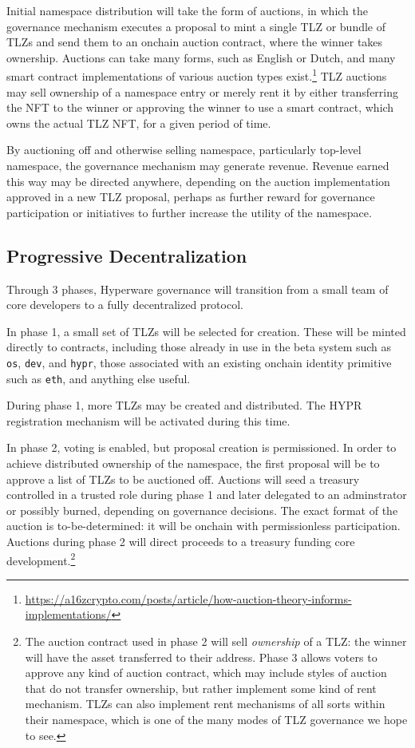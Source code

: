 \documentclass[runningheads]{llncs}
\begin{document}
Initial namespace distribution will take the form of auctions, in which the governance mechanism executes a proposal to mint a single TLZ or bundle of TLZs and send them to an onchain auction contract, where the winner takes ownership.
Auctions can take many forms, such as English or Dutch, and many smart contract implementations of various auction types exist.\footnote{\url{https://a16zcrypto.com/posts/article/how-auction-theory-informs-implementations/}}
TLZ auctions may sell ownership of a namespace entry or merely rent it by either transferring the NFT to the winner or approving the winner to use a smart contract, which owns the actual TLZ NFT, for a given period of time.

By auctioning off and otherwise selling namespace, particularly top-level namespace, the governance mechanism may generate revenue.
Revenue earned this way may be directed anywhere, depending on the auction implementation approved in a new TLZ proposal, perhaps as further reward for governance participation or initiatives to further increase the utility of the namespace.

\subsection{Progressive Decentralization}
\label{sec:decentralization}

Through 3 phases, Hyperware governance will transition from a small team of core developers to a fully decentralized protocol.

In phase 1, a small set of TLZs will be selected for creation.
These will be minted directly to contracts, including those already in use in the beta system such as \verb|os|, \verb|dev|, and \verb|hypr|, those associated with an existing onchain identity primitive such as \verb|eth|, and anything else useful.

During phase 1, more TLZs may be created and distributed.
The HYPR registration mechanism will be activated during this time.

In phase 2, voting is enabled, but proposal creation is permissioned.
In order to achieve distributed ownership of the namespace, the first proposal will be to approve a list of TLZs to be auctioned off.
Auctions will seed a treasury controlled in a trusted role during phase 1 and later delegated to an adminstrator or possibly burned, depending on governance decisions.
The exact format of the auction is to-be-determined: it will be onchain with permissionless participation.
Auctions during phase 2 will direct proceeds to a treasury funding core development.\footnote{The auction contract used in phase 2 will sell \textit{ownership} of a TLZ: the winner will have the asset transferred to their address.
Phase 3 allows voters to approve any kind of auction contract, which may include styles of auction that do not transfer ownership, but rather implement some kind of rent mechanism.
TLZs can also implement rent mechanisms of all sorts within their namespace, which is one of the many modes of TLZ governance we hope to see.}
\end{document}
